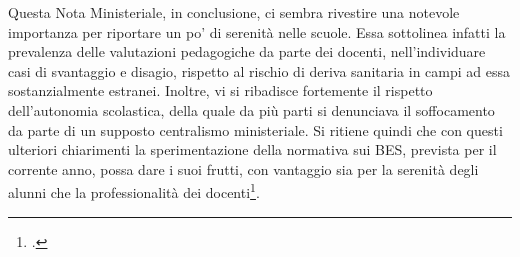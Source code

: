 Questa Nota Ministeriale, in conclusione, ci sembra rivestire una notevole importanza per riportare un po' di serenità nelle scuole. Essa sottolinea infatti la prevalenza delle valutazioni pedagogiche da parte dei docenti, nell'individuare casi di svantaggio e disagio, rispetto al rischio di deriva sanitaria in campi ad essa sostanzialmente estranei. Inoltre, vi si ribadisce fortemente il rispetto dell'autonomia scolastica, della quale da più parti si denunciava il soffocamento da parte di un supposto centralismo ministeriale.
Si ritiene quindi che con questi ulteriori chiarimenti la sperimentazione della normativa sui BES, prevista per il corrente anno, possa dare i suoi frutti, con vantaggio sia per la serenità degli alunni che la professionalità dei docenti\footcite{Nocera2013a}.